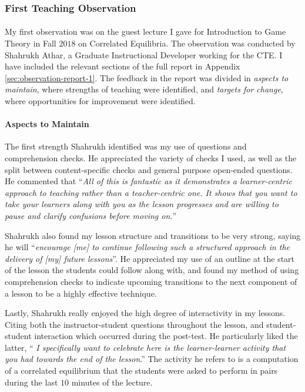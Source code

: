 \documentclass{article}
\begin{document}
\subsubsection*{First Teaching Observation}
\paragraph{}
My first observation was on the guest lecture I gave for Introduction to Game Theory in Fall $2018$ on Correlated Equilibria. The observation was conducted by Shahrukh Athar, a Graduate Instructional Developer working for the CTE. I have included the relevant sections of the full report in Appendix \ref{sec:observation-report-1}. The feedback in the report was divided in \emph{aspects to maintain}, where strengths of teaching were identified, and \emph{targets for change}, where opportunities for improvement were identified.
\paragraph{Aspects to Maintain} The first strength Shahrukh identified was my use of questions and comprehension checks. He appreciated the variety of checks I used, as well as the split between content-specific checks and general purpose open-ended questions. He commented that ``\emph{All of this is
fantastic as it demonstrates a learner-centric approach to teaching rather than a teacher-centric
one. It shows that you want to take your learners along with you as the lesson progresses and
are willing to pause and clarify confusions before moving on.}'' 

Shahrukh also found my lesson structure and transitions to be very strong, saying he will ``\emph{encourage [me] to continue
following such a structured approach in the delivery of [my] future lessons}''. He appreciated my use of an outline at the start of the lesson the students could follow along with, and found my method of using comprehension checks to indicate upcoming transitions to the next component of a lesson to be a highly effective technique.

Lastly, Shahrukh really enjoyed the high degree of interactivity in my lessons. Citing both the instructor-student questions throughout the lesson, and student-student interaction which occurred during the post-test. He particularly liked the latter, ``\emph{ I specifically want to celebrate here is the learner-learner
activity that you had towards the end of the lesson}.'' The activity he refers to is a computation of a correlated equilibrium that the students were asked to perform in pairs during the last $10$ minutes of the lecture.
\end{document}
